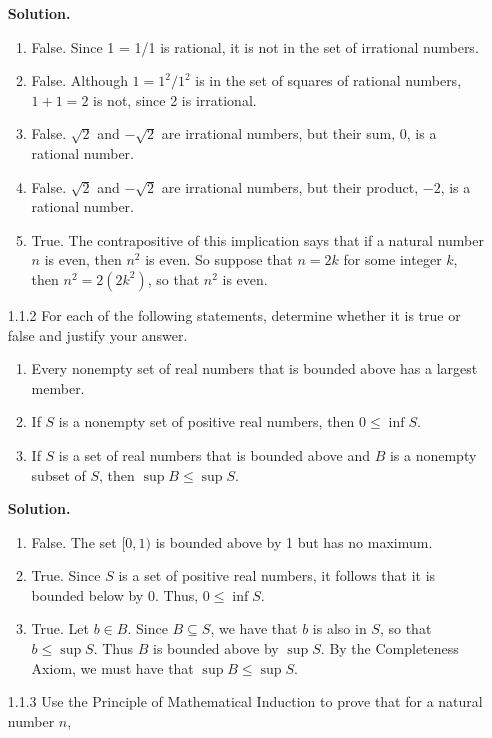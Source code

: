 \begin{enumerate}
      \textbf{Solution.} 

      \begin{enumerate}
         \item False. Since 1 = 1/1 is rational, it is not in the set of 
               irrational numbers.
         \item False. Although $1 = 1^2/1^2$ is in the set of squares of 
               rational numbers, $1 + 1 = 2$ is not, since 2 is irrational.
         \item False. $\sqrt{2}$ and $-\sqrt{2}$ are irrational numbers, but
               their sum, 0, is a rational number.
         \item False. $\sqrt{2}$ and $-\sqrt{2}$ are irrational numbers, but
               their product, $-2$, is a rational number.
         \item True. The contrapositive of this implication says that if a
               natural number $n$ is even, then $n^2$ is even. So suppose that
               $n = 2k$ for some integer $k$, then $n^2 = 2(2k^2 )$, so that
               $n^2$ is even.
      \end{enumerate}

   \item[1.1.2]   For each of the following statements, determine whether it is 
                  true or false and justify your answer.
                  \begin{enumerate}
                     \item Every nonempty set of real numbers that is bounded 
                           above has a largest member.
                     \item If $S$ is a nonempty set of positive real numbers, 
                           then $0 \le \inf S$.
                     \item If $S$ is a set of real numbers that is bounded above
                           and $B$ is a nonempty subset of $S$, then
                           $\sup B \le \sup S$.
                  \end{enumerate}

      \textbf{Solution.}

      \begin{enumerate}
         \item False. The set $[0, 1)$ is bounded above by 1 but has no maximum.
         \item True. Since $S$ is a set of positive real numbers, it follows 
               that it is bounded below by $0$. Thus, $0 \le \inf S$.
         \item True. Let $b \in B$. Since $B \subseteq S$, we have that $b$ is
               also in $S$, so that $b \le \sup S$. Thus $B$ is bounded above
               by $\sup S$. By the Completeness Axiom, we must have that
               $\sup B \le \sup S$.
      \end{enumerate}
   \item[1.1.3]   Use the Principle of Mathematical Induction to prove that for 
                  a natural number $n$,


\end{enumerate}
